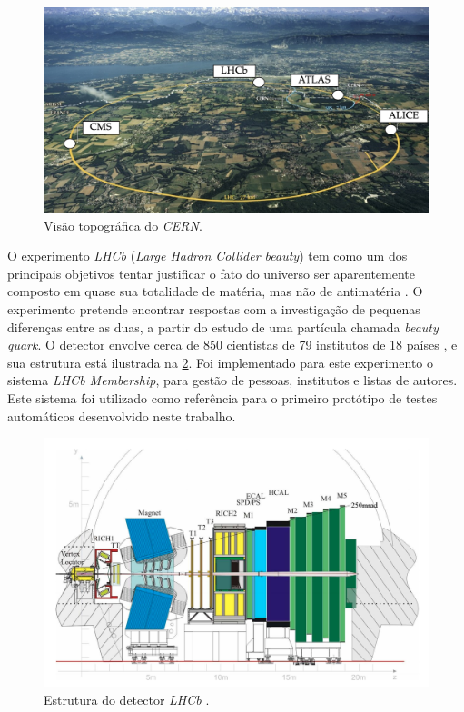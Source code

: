 \begin{figure}[H]
    \centering
    \includegraphics[width=15cm]{source/2-contextualizacao/images/LHC-now.png}
    \caption{Visão topográfica do \emph{CERN}.}
    \label{fig:cern-overview}
\end{figure}

O experimento \emph{LHCb} (\emph{Large Hadron Collider beauty}) tem como um dos principais objetivos tentar justificar o fato do universo ser aparentemente composto em quase sua totalidade de matéria, mas não de antimatéria \cite{cernsiteabout}. O experimento pretende encontrar respostas com a investigação de pequenas diferenças entre as duas, a partir do estudo de uma partícula chamada \emph{beauty quark}. O detector envolve cerca de 850 cientistas de 79 institutos de 18 países \cite{cernsitelhcb}, e sua estrutura está ilustrada na \ref{fig:lhcb-detector}. Foi implementado para este experimento o sistema \emph{LHCb Membership}, para gestão de pessoas, institutos e listas de autores. Este sistema foi utilizado como referência para o primeiro protótipo de testes automáticos desenvolvido neste trabalho.

\begin{figure}[H]
    \centering
    \includegraphics[width=14cm]{source/2-contextualizacao/images/lhcb-detector.png}
    \caption{Estrutura do detector \emph{LHCb} \cite{lhcb}.}
    \label{fig:lhcb-detector}
\end{figure}

